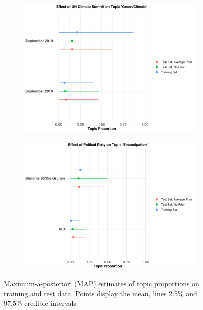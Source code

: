\begin{figure}[h!]
  \centering
  \captionsetup{justification=centering}
  \begin{subfigure}[b]{0.49\linewidth}
    \includegraphics[width=\linewidth]{../plots/6_2/climate_summit_props.pdf}
  \end{subfigure}
  \begin{subfigure}[b]{0.49\linewidth}
    \includegraphics[width=\linewidth]{../plots/6_2/emancipation_props.pdf}
  \end{subfigure}
  \caption{Maximum-a-posteriori (MAP) estimates of topic proportions on training and test data. Points display the mean, lines 2.5\% and 97.5\% credible intervals.}
  \label{fig:causal_inference_props}
\end{figure}

